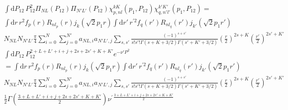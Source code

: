 \documentclass[10pt]{article}
\begin{document}
\begin{multline*}
\int \text{d} P_{12} \, P_{12}^{2} \Pi_{N L}(P_{12}) \Pi_{N' L'}(P_{12}) 
\chi_{p,nl}^{kK}(p_1,P_{12}) \chi_{q,n'l'}^{k'K'}(p_1,P_{12}) = \\
 \int \text{d} r\, r^{2} f_{p}(r) R_{n l_p}(r) j_{k}( \sqrt{2} p_1 r)  
 \int \text{d} r' \, r^{\prime 2} f_{q}(r') R_{n l_q}(r') j_{k'}( \sqrt{2} p_1 
r')   \\
  N_{NL} N_{N'L'} \frac{ \pi}{4}  \sum_{i=0}^{N} \sum_{j=0}^{N'} a_{NL,i}  
a_{N'L',j} 
 \sum_{s,s'} \frac{(-1)^{s+s'}}{s! s'! \Gamma(s+K+3/2) \Gamma(s'+K'+3/2)}  
\left( \frac{r}{2} \right)^{2s+K} \left( \frac{r'}{2} \right)^{2s'+K'} \\
  \int \text{d} P_{12} \, P_{12}^{2+L+L'+i+j+2s+2s'+K+K'} e^{-\nu' P^{2}} \\
  = \int \text{d} r\, r^{2} f_{p}(r) R_{n l_p}(r) j_{k}( \sqrt{2} p_1 r)  
 \int \text{d} r' \, r^{\prime 2} f_{q}(r') R_{n l_q}(r') j_{k'}( \sqrt{2} p_1 
r')   \\
  N_{NL} N_{N'L'} \frac{ \pi}{4}  \sum_{i=0}^{N} \sum_{j=0}^{N'} a_{NL,i}  
a_{N'L',j} 
 \sum_{s,s'} \frac{(-1)^{s+s'}}{s! s'! \Gamma(s+K+3/2) \Gamma(s'+K'+3/2)}  
\left( \frac{r}{2} \right)^{2s+K} \left( \frac{r'}{2} \right)^{2s'+K'} \\
  \frac{1}{2} \Gamma \left( \frac{3+L+L'+i+j+2s+2s'+K+K'}{2} \right) 
\nu^{\prime \, \frac{3+L+L'+i+j+2s+2s'+K+K'}{2} }
\end{multline*}
\end{document}
